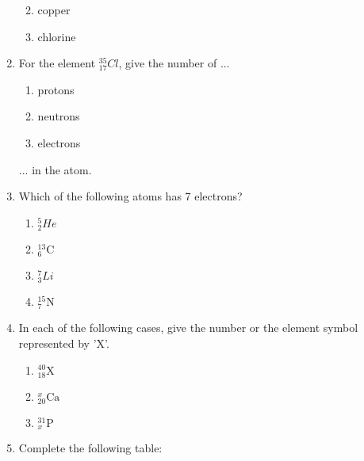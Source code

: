 \begin{enumerate}[noitemsep, label=\textbf{\arabic*}. ]
\begin{enumerate}[noitemsep, label=\textbf{\alph*}. ]
\label{m38745*uid22}\item copper
\label{m38745*uid23}\item chlorine
\end{enumerate}
                \label{m38745*uid24}\item 
For the element $_{17}^{35}Cl$, give the number of ...
\label{m38745*id256843}\begin{enumerate}[noitemsep, label=\textbf{\alph*}. ] 
            \label{m38745*uid25}\item protons
\label{m38745*uid26}\item neutrons
\label{m38745*uid27}\item electrons
\end{enumerate}
... in the atom.\newline
\label{m38745*uid28}\item Which of the following atoms has 7 electrons?
\label{m38745*id256898}\begin{enumerate}[noitemsep, label=\textbf{\alph*}. ] 
            \label{m38745*uid29}\item $_{2}^{5}He$
\label{m38745*uid30}\item $_{6}^{13}\mathrm{C}$
\label{m38745*uid31}\item $_{3}^{7}Li$
\label{m38745*uid32}\item $_{7}^{15}\mathrm{N}$
\end{enumerate}
                \label{m38745*uid33}\item 
In each of the following cases, give the number or the element symbol represented by 'X'.
\label{m38745*id257023}\begin{enumerate}[noitemsep, label=\textbf{\alph*}. ] 
            \label{m38745*uid34}\item $_{18}^{40}\mathrm{X}$
\label{m38745*uid35}\item $_{20}^{x}\mathrm{Ca}$
\label{m38745*uid36}\item $_{x}^{31}\mathrm{P}$
\end{enumerate}
                \label{m38745*uid37}\item 
Complete the following table:
          \begin{table}[H]
        \begin{center}
      \label{m38745*id257121}
    \noindent
\end{center}
\end{table}
\end{enumerate}
